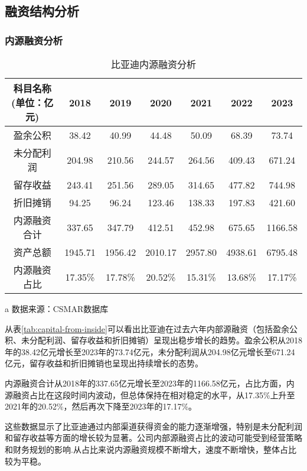\subsection{融资结构分析}
\subsubsection{内源融资分析}
\begin{table}
  \centering
  \begin{threeparttable}[c]
    \caption{比亚迪内源融资分析}
    \label{tab:capital-from-inside}
    \begin{tabular}{ccccccc}
      \toprule
        科目名称(单位：亿元) & 2018 & 2019 & 2020 & 2021 & 2022 & 2023 \\ 
      \midrule
        盈余公积 & 38.42  & 40.99  & 44.48  & 50.09  & 68.39  & 73.74  \\ 
        未分配利润 & 204.98  & 210.56  & 244.57  & 264.56  & 409.43  & 671.24  \\ 
        留存收益 & 243.41  & 251.56  & 289.05  & 314.65  & 477.82  & 744.98  \\ 
        折旧摊销 & 94.25  & 96.24  & 123.46  & 138.33  & 197.83  & 421.60  \\ 
        内源融资合计 & 337.65  & 347.79  & 412.51  & 452.98  & 675.65  & 1166.58  \\ 
        资产总额 & 1945.71  & 1956.42  & 2010.17  & 2957.80  & 4938.61  & 6795.48  \\ 
        内源融资占比 & 17.35\% & 17.78\% & 20.52\% & 15.31\% & 13.68\% & 17.17\% \\ 
      \bottomrule
    \end{tabular}
    \begin{tablenotes}
      \item [a] 数据来源：CSMAR数据库
    \end{tablenotes}
  \end{threeparttable}
\end{table}
从表\eqref{tab:capital-from-inside}可以看出比亚迪在过去六年内部源融资（包括盈余公积、未分配利润、留存收益和折旧摊销）呈现出稳步增长的趋势。盈余公积从2018年的38.42亿元增长至2023年的73.74亿元，未分配利润从204.98亿元增长至671.24亿元，留存收益和折旧摊销也呈现出持续增长的态势。

内源融资合计从2018年的337.65亿元增长至2023年的1166.58亿元，占比方面，内源融资占比在这段时间内波动，但总体保持在相对稳定的水平，从17.35\%上升至2021年的20.52\%，然后再次下降至2023年的17.17\%。

这些数据显示了比亚迪通过内部渠道获得资金的能力逐渐增强，特别是未分配利润和留存收益等方面的增长较为显著。公司内部源融资占比的波动可能受到经营策略和财务规划的影响.从占比来说内源融资规模不断增大，速度不断增快，整体占比较为平稳。
